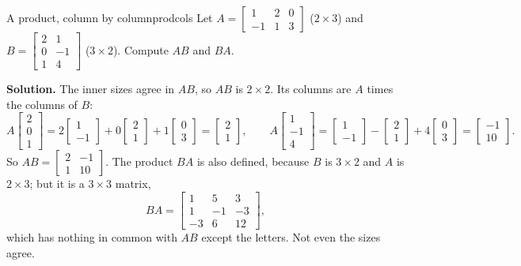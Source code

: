 \documentclass[11pt]{article}
\begin{document}
\begin{exmp}{A product, column by column}{prodcols}
Let $A=\begin{bmatrix}1&2&0\\-1&1&3\end{bmatrix}$ ($2\times3$) and $B=\begin{bmatrix}2&1\\0&-1\\1&4\end{bmatrix}$ ($3\times2$). Compute $AB$ and $BA$.

\textbf{Solution.} The inner sizes agree in $AB$, so $AB$ is $2\times2$. Its columns are $A$ times the columns of $B$:
\[
A\begin{bmatrix}2\\0\\1\end{bmatrix}=2\begin{bmatrix}1\\-1\end{bmatrix}+0\begin{bmatrix}2\\1\end{bmatrix}+1\begin{bmatrix}0\\3\end{bmatrix}=\begin{bmatrix}2\\1\end{bmatrix},\qquad
A\begin{bmatrix}1\\-1\\4\end{bmatrix}=\begin{bmatrix}1\\-1\end{bmatrix}-\begin{bmatrix}2\\1\end{bmatrix}+4\begin{bmatrix}0\\3\end{bmatrix}=\begin{bmatrix}-1\\10\end{bmatrix}.
\]
So $AB=\begin{bmatrix}2&-1\\1&10\end{bmatrix}$. The product $BA$ is also defined, because $B$ is $3\times2$ and $A$ is $2\times3$; but it is a $3\times3$ matrix,
\[
BA=\begin{bmatrix}1&5&3\\1&-1&-3\\-3&6&12\end{bmatrix},
\]
which has nothing in common with $AB$ except the letters. Not even the sizes agree.
\end{exmp}
\end{document}
